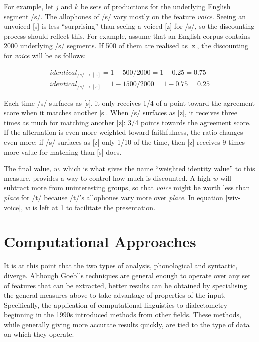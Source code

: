 \documentclass[11pt]{article}
\begin{document}
  For example, let $j$ and $k$ be sets of productions for the
  underlying English segment /s/. The allophones of /s/ vary mostly on the feature
  \textit{voice}. Seeing an unvoiced [s] is less ``surprising'' than
  seeing a voiced [z] for /s/, so the discounting process should
  reflect this. For example, assume that an English corpus contains 2000
  underlying /s/ segments. If 500 of them are realised as [z], the
  discounting for \textit{voice} will be as follows:

  \begin{equation}
    \begin{array}{c}
      identical_{/s/\to[z]} = 1 - 500/2000 = 1 - 0.25 = 0.75 \\
      identical_{/s/\to[s]} = 1 - 1500/2000 = 1 - 0.75 = 0.25
    \end{array}
    \label{wiv-voice}
  \end{equation}

  Each time /s/ surfaces as [s], it only receives 1/4 of a point
  toward the agreement score when it matches another [s]. When /s/
  surfaces as [z], it receives three times as much for matching
  another [z]: 3/4 points towards the agreement score. If the
  alternation is even more weighted toward faithfulness, the ratio
  changes even more; if /s/ surfaces as [z] only 1/10 of the time,
  then [z] receives 9 times more value for matching than [s] does.

  The final value, $w$, which is what gives the name ``weighted
  identity value'' to this measure, provides a way to control how much
  is discounted. A high $w$ will subtract more from uninteresting
  groups, so that \textit{voice} might be worth less than
  \textit{place} for /t/ because /t/'s allophones vary more over
  \textit{place}. In equation \ref{wiv-voice}, $w$ is left at 1 to
  facilitate the presentation.


\section{Computational Approaches}

It is at this point that the two types of analysis, phonological and
syntactic, diverge. Although Goebl's techniques are general enough to
operate over any set of features that can be extracted, better results
can be obtained by specialising the general measures above to take
advantage of properties of the input.  Specifically, the application
of computational linguistics to dialectometry beginning in the 1990s
introduced methods from other fields. These methods, while generally
giving more accurate results quickly, are tied to the type of data on
which they operate.
\end{document}
